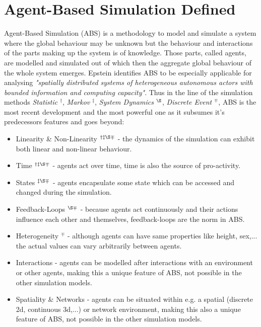 \section{Agent-Based Simulation Defined}
Agent-Based Simulation (ABS) is a methodology to model and simulate a system where the global behaviour may be unknown but the behaviour and interactions of the parts making up the system is of knowledge. Those parts, called agents, are modelled and simulated out of which then the aggregate global behaviour of the whole system emerges. Epstein \cite{epstein_generative_2012} identifies ABS to be especially applicable for analysing \textit{"spatially distributed systems of heterogeneous autonomous actors with bounded information and computing capacity"}. Thus in the line of the simulation methods \textit{Statistic} $^\dag$, \textit{Markov} $^\ddag$, \textit{System Dynamics} $^\S$, \textit{Discrete Event} $^\mp$, ABS is the most recent development and the most powerful one as it subsumes it's predecessors features and goes beyond:

\begin{itemize}
	\item Linearity \& Non-Linearity $^{\dag \ddag \S \mp}$ - the dynamics of the simulation can exhibit both linear and non-linear behaviour. 
	\item Time $^{\dag \ddag \S \mp}$ - agents act over time, time is also the source of pro-activity.
	\item States $^{\ddag \S \mp}$ - agents encapsulate some state which can be accessed and changed during the simulation.
	\item Feedback-Loops $^{\S \mp}$ - because agents act continuously and their actions influence each other and themselves, feedback-loops are the norm in ABS. 
	\item Heterogeneity $^{\mp}$ - although agents can have same properties like height, sex,... the actual values can vary arbitrarily between agents.
	\item Interactions - agents can be modelled after interactions with an environment or other agents, making this a unique feature of ABS, not possible in the other simulation models.
	\item Spatiality \& Networks - agents can be situated within e.g. a spatial (discrete 2d, continuous 3d,...) or network environment, making this also a unique feature of ABS, not possible in the other simulation models.
\end{itemize}

